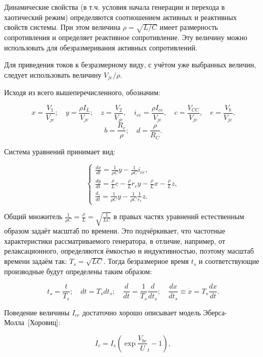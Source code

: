 \documentclass[a4paper,12pt]{article}
\begin{document}
Динамические свойства (в т.ч. условия начала генерации и перехода в хаотический режим) определяются
соотношением активных и реактивных свойств системы. При этом величина
$ \rho = \sqrt{L/C} $ имеет размерность сопротивления
и определяет реактивное сопротивление. Эту величину можно использовать
для обезразмеривания активных сопротивлений.

Для приведения токов к безразмерному виду, с учётом уже выбранных величин,
следует использовать величину $ V_{je} / \rho$.


Исходя из всего вышеперечисленного, обозначим:

\[
  x = \frac{V_{1}}{V_{je}} ; \quad
  y = \frac{\rho I_L}{V_{je}} ; \quad
  z = \frac{V_{2}}{V_{je}}, \quad
  i_{ce} = \frac{\rho I_{ce}}{V_{je}}, \quad
  c = \frac{V_{CC}}{V_{je}}, \quad
  e = \frac{V_{b}}{V_{je}}.
\]
\[
  b = \frac{R_c}{\rho}; \quad
  d = \frac{\rho}{R_C}. %
\]

Система уравнений принимает вид:


\begin{equation}
\label{atu:eq:colp_phys2}
\begin{cases}
  \frac{d x}{dt}  = \frac{1}{\rho C}  y - \frac{1}{\rho C} i_{ce} , \\
  \frac{d y}{dt}  = \frac{\rho}{L} c    - \frac{\rho}{L} r_c y - \frac{\rho}{L} x- \frac{\rho}{L} z, \\
  \frac{d_z}{dt}  = \frac{1}{\rho C}  y - \frac{1}{\rho C} \frac{1}{r_e} z.
\end{cases}
\end{equation}

Общий множитель $ \frac{1}{\rho C} = \frac{\rho}{L} = \sqrt{\frac{1}{LC}} $ в правых частях уравнений
естественным образом задаёт масштаб по времени.
Это подчёркивает, что частотные характеристики рассматриваемого генератора,
в отличие, например, от релаксационного,
определяются ёмкостью и индуктивностью,
поэтому масштаб времени задаём так:
$ T_s = \sqrt{L C} $.
Тогда безразмерное время $t_s$
и соответствующие производные
будут определены таким образом:

\[
  t_s = \frac{t}{T_s}; \quad
  dt = T_s dt_s; \quad
  \frac{d}{dt} = \frac{1}{T_s} \frac{d}{dt_s}; \quad
  \frac{dx}{dt_s} \equiv \dot{x} = T_s \frac{dx}{dt} .
\]

Поведение величины $I_{ce}$ достаточно хорошо описывает модель
Эберса-Молла~[Хоровиц]:

\begin{equation}
  I_c = I_s \left( \exp\frac{V_{be}}U_t{} - 1 \right),
  \label{atu:eq:ebers-moll}
\end{equation}
\end{document}
